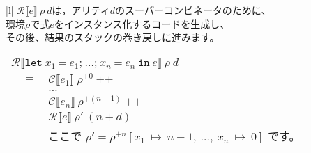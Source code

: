\documentclass{jarticle}
\begin{document}
\begin{tabular} {|l|} \hline
	$\mathcal{R} \llbracket e \rrbracket ~ \rho ~ d$は，アリティ$d$のスーパーコンビネータのために、               \\
	環境$\rho$で式$e$をインスタンス化するコードを生成し、                                                         \\
	その後、結果のスタックの巻き戻しに進みます。                                                                  \\
	\begin{tabular}{r c l}
		\multicolumn{3}{l}{$\mathcal{R} \llbracket \texttt{let} ~ x_1 ~ \texttt{=} ~ e_1\texttt{;} ~  \ldots \texttt{;} ~ x_n ~ \texttt{=} ~ e_n ~ \texttt{in} ~ e \rrbracket ~ \rho ~ d$}                                                                                                                           \\
		                                                                                      & $=$ & $\mathcal{C} \llbracket e_1 \rrbracket ~ \rho^{+0} ~ \texttt{++}$                                                                                                                                              \\
		                                                                                      &     & $\ldots$                                                                                                                                                                                                       \\
		                                                                                      &     & $\mathcal{C} \llbracket e_n \rrbracket ~ \rho^{+(n - 1)} ~ \texttt{++}$                                                                                                                                        \\
		                                                                                      &     & $\mathcal{R} \llbracket e \rrbracket ~ \rho' ~ (n + d)$                                                                                                                                                        \\
		                                                                                      &     & ここで $\rho' = \rho^{+n} \left[x_1 ~ \mapsto ~ n - 1, ~ \ldots , ~ x_n ~ \mapsto ~ 0\right]$ です。                                                                                                           \\

\end{tabular}
\end{tabular}
\end{document}
